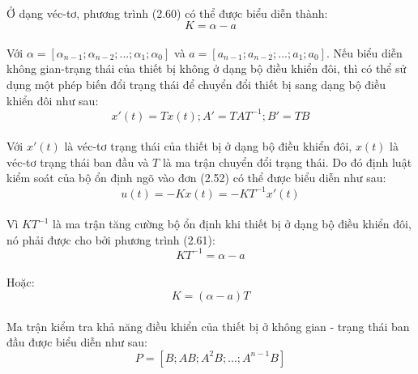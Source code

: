 \paragraph{}Ở dạng véc-tơ, phương trình (2.60) có thể được biểu diễn thành:
\begin{equation}
K = \alpha - a
\end{equation}
\paragraph{}Với $\alpha = [\alpha_{n-1}; \alpha_{n-2}; ...; \alpha_{1}; \alpha_{0}]$ và $a = [a_{n-1}; a_{n-2}; ...; a_{1}; a_{0}]$. Nếu biểu diễn không gian-trạng thái của thiết bị không ở dạng bộ điều khiển đôi, thì có thể sử dụng một phép biến đổi trạng thái để chuyển đổi thiết bị sang dạng bộ điều khiển đôi như sau:
\begin{equation}
x'(t) = Tx(t); A' = TAT^{-1}; B' = TB
\end{equation}
\paragraph{}Với $x'(t)$ là véc-tơ trạng thái của thiết bị ở dạng bộ điều khiển đôi, $x(t)$ là véc-tơ trạng thái ban đầu và $T$ là ma trận chuyển đổi trạng thái. Do đó định luật kiểm soát của bộ ổn định ngõ vào đơn (2.52) có thể được biểu diễn như sau: 
\begin{equation}
u(t) = -Kx(t) = -KT^{-1}x'(t)
\end{equation}
\paragraph{}Vì $KT^{-1}$ là ma trận tăng cường bộ ổn định khi thiết bị ở dạng bộ điều khiển đôi, nó phải được cho bởi phương trình (2.61):
\begin{equation}
KT^{-1} = \alpha - a
\end{equation}
\paragraph{}Hoặc:
\begin{equation}
K = (\alpha - a)T
\end{equation}
\paragraph{}Ma trận kiểm tra khả năng điều khiển của thiết bị ở không gian - trạng thái ban đầu được biểu diễn như sau: 
\begin{equation}
P = [B; AB; A^{2}B; ...; A^{n-1}B]  
\end{equation}
